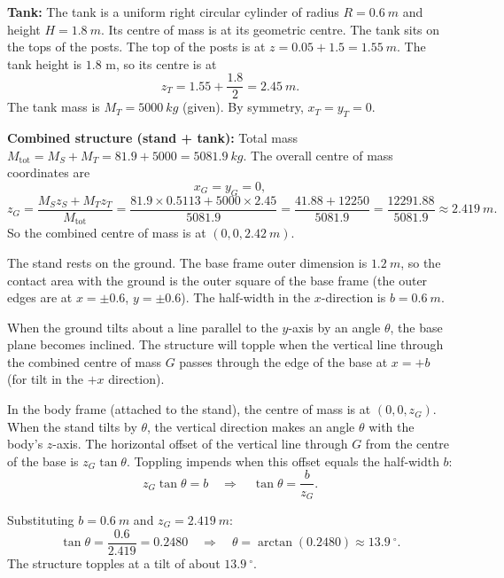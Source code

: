 \documentclass[11pt]{article}
\begin{document}
\begin{exoresolu}
\noindent\textbf{Tank:} The tank is a uniform right circular cylinder of radius $R = \SI{0.6}{m}$ and height $H = \SI{1.8}{m}$. Its centre of mass is at its geometric centre. The tank sits on the tops of the posts. The top of the posts is at $z = 0.05 + 1.5 = \SI{1.55}{m}$. The tank height is $1.8$ m, so its centre is at
\[
z_T = 1.55 + \frac{1.8}{2} = \SI{2.45}{m}.
\]
The tank mass is $M_T = \SI{5000}{kg}$ (given). By symmetry, $x_T = y_T = 0$.

\textbf{Combined structure (stand + tank):} Total mass $M_{\text{tot}} = M_S + M_T = 81.9 + 5000 = \SI{5081.9}{kg}$.
The overall centre of mass coordinates are
\[
x_G = y_G = 0,
\]
\[
z_G = \frac{M_S z_S + M_T z_T}{M_{\text{tot}}}
= \frac{81.9 \times 0.5113 + 5000 \times 2.45}{5081.9}
= \frac{41.88 + 12250}{5081.9} = \frac{12291.88}{5081.9} \approx \SI{2.419}{m}.
\]
So the combined centre of mass is at $(0, 0, \SI{2.42}{m})$.
\end{exoresolu}

\begin{exoresolu}
The stand rests on the ground. The base frame outer dimension is $\SI{1.2}{m}$, so the contact area with the ground is the outer square of the base frame (the outer edges are at $x = \pm0.6$, $y = \pm0.6$). The half‑width in the $x$-direction is $b = \SI{0.6}{m}$.

When the ground tilts about a line parallel to the $y$-axis by an angle $\theta$, the base plane becomes inclined. The structure will topple when the vertical line through the combined centre of mass $G$ passes through the edge of the base at $x = +b$ (for tilt in the $+x$ direction).

In the body frame (attached to the stand), the centre of mass is at $(0, 0, z_G)$. When the stand tilts by $\theta$, the vertical direction makes an angle $\theta$ with the body's $z$-axis. The horizontal offset of the vertical line through $G$ from the centre of the base is $z_G \tan\theta$. Toppling impends when this offset equals the half‑width $b$:
\[
z_G \tan\theta = b \quad\Longrightarrow\quad \tan\theta = \frac{b}{z_G}.
\]

Substituting $b = \SI{0.6}{m}$ and $z_G = \SI{2.419}{m}$:
\[
\tan\theta = \frac{0.6}{2.419} = 0.2480 \quad\Longrightarrow\quad \theta = \arctan(0.2480) \approx \SI{13.9}{\ensuremath{{}^{\circ}}}.
\]
The structure topples at a tilt of about $\SI{13.9}{\ensuremath{{}^{\circ}}}$.
\end{exoresolu}
\end{document}
